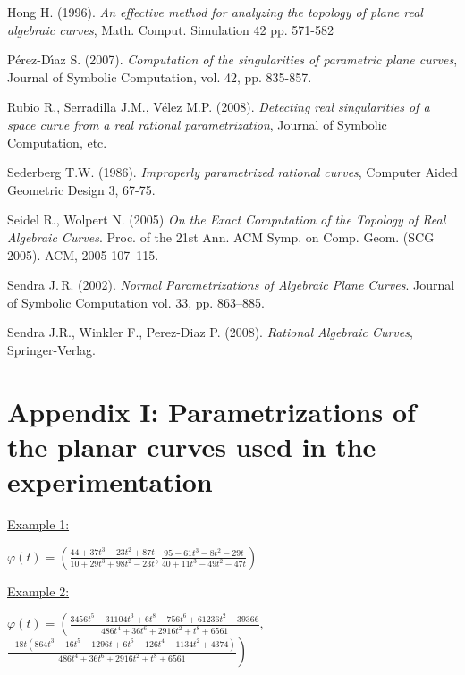 \documentclass{elsart}
\begin{document}
\begin{thebibliography}{56}
 Hong H. (1996). {\it An effective
method for analyzing the topology of plane real algebraic curves},
Math. Comput. Simulation 42 pp. 571-582

 P\'erez-D\'{\i}az S. (2007). {\it Computation of the singularities of parametric plane curves}, Journal of Symbolic Computation, vol. 42, pp. 835-857.



 Rubio R., Serradilla J.M., V\'elez M.P. (2008). {\it Detecting real singularities of a space curve from a real rational parametrization}, Journal of Symbolic Computation, etc.




 Sederberg T.W. (1986). {\it Improperly parametrized rational curves}, Computer Aided Geometric Design 3, 67-75.

 Seidel R., Wolpert N. (2005) {\it On the Exact Computation of the
Topology of Real Algebraic Curves}. Proc. of the 21st Ann. ACM Symp. on Comp. Geom. (SCG 2005). ACM, 2005 107--115.

 Sendra J.\,R. (2002).
{\it Normal Parametrizations of Algebraic Plane Curves}.
 Journal of Symbolic Computation vol. 33, pp. 863--885.







 Sendra J.R., Winkler F., Perez-Diaz P. (2008). {\it Rational Algebraic Curves}, Springer-Verlag.





\end{thebibliography}


\newpage

\section*{Appendix I: Parametrizations of the planar curves used in
the experimentation}\label{appen}

\underline{Example 1:}

$\varphi(t)=\left(\displaystyle{\frac{44+37t^3-23t^2+87t}{10+29t^3+98t^2-23t}},\mbox{
}
\displaystyle{\frac{95-61t^3-8t^2-29t}{40+11t^3-49t^2-47t}}\right)$


\underline{Example 2:}

$\varphi(t)=\left(\displaystyle{\frac{3456t^5-31104t^3+6t^8-756t^6+61236t^2-39366}{486t^4+36t^6+2916t^2+t^8+6561}},\right.
$\\
$\left.\displaystyle{\frac{-18t(864t^3-16t^5-1296t+6t^6-126t^4-1134t^2+4374)}{486t^4+36t^6+2916t^2+t^8+6561}}\right)$
\end{document}

